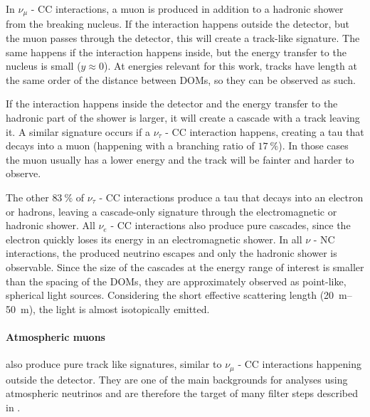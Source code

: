 In $\nu_\mu$ - CC interactions, a muon is produced in addition to a hadronic shower from the breaking nucleus. If the interaction happens outside the detector, but the muon passes through the detector, this will create a track-like signature. The same happens if the interaction happens inside, but the energy transfer to the nucleus is small ($y \approx 0$). At energies relevant for this work, tracks have length at the same order of the distance between DOMs, so they can be observed as such.

If the interaction happens inside the detector and the energy transfer to the hadronic part of the shower is larger, it will create a cascade with a track leaving it. A similar signature occurs if a $\nu_\tau$ - CC interaction happens, creating a tau that decays into a muon (happening with a branching ratio of $\SI{17}{\percent}$). In those cases the muon usually has a lower energy and the track will be fainter and harder to observe.

The other $\SI{83}{\percent}$ of $\nu_\tau$ - CC interactions produce a tau that decays into an electron or hadrons, leaving a cascade-only signature through the electromagnetic or hadronic shower. All $\nu_e$ - CC interactions also produce pure cascades, since the electron quickly loses its energy in an electromagnetic shower. In all $\nu$ - NC interactions, the produced neutrino escapes and only the hadronic shower is observable. Since the size of the cascades at the energy range of interest is smaller than the spacing of the DOMs, they are approximately observed as point-like, spherical light sources. Considering the short effective scattering length (\SIrange[range-phrase=-]{20}{50}{\metre}), the light is almost isotopically emitted.


\paragraph{Atmospheric muons} also produce pure track like signatures, similar to $\nu_\mu$ - CC interactions happening outside the detector. They are one of the main backgrounds for analyses using atmospheric neutrinos and are therefore the target of many filter steps described in .
